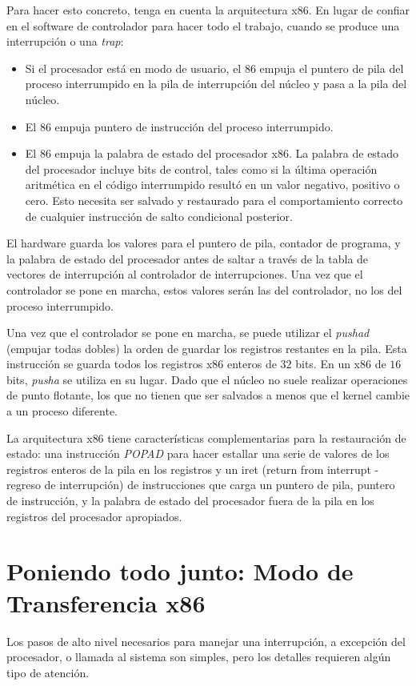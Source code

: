 \documentclass[10pt]{book}
\begin{document}
Para hacer esto concreto, tenga en cuenta la arquitectura x$86$. En lugar de confiar en el software de controlador para hacer todo el trabajo, cuando se produce una interrupción o una \textit{trap}:
\begin{itemize}
\item Si el procesador está en modo de usuario, el $86$ empuja el puntero de pila del proceso interrumpido en la pila de interrupción del núcleo y pasa a la pila del núcleo.

\item El $86$ empuja puntero de instrucción del proceso interrumpido.

\item El $86$ empuja la palabra de estado del procesador x$86$. La palabra de estado del procesador incluye bits de control, tales como si la última operación aritmética en el código interrumpido resultó en un valor negativo, positivo o cero. Esto necesita ser salvado y restaurado para el comportamiento correcto de cualquier instrucción de salto condicional posterior.
\end{itemize}

El hardware guarda los valores para el puntero de pila, contador de programa, y la palabra de estado del procesador antes de saltar a través de la tabla de vectores de interrupción al controlador de interrupciones. Una vez que el controlador se pone en marcha, estos valores serán las del controlador, no los del proceso interrumpido.

Una vez que el controlador se pone en marcha, se puede utilizar el \textit{pushad} (empujar todas dobles) la orden de guardar los registros restantes en la pila. Esta instrucción se guarda todos los registros x$86$ enteros de $32$ bits. En un x$86$ de $16$ bits, \textit{pusha} se utiliza en su lugar. Dado que el núcleo no suele realizar operaciones de punto flotante, los que no tienen que ser salvados a menos que el kernel cambie a un proceso diferente.

La arquitectura x$86$ tiene características complementarias para la restauración de estado: una instrucción \textit{POPAD} para hacer estallar una serie de valores de los registros enteros de la pila en los registros y un iret (return from interrupt - regreso de interrupción) de instrucciones que carga un puntero de pila, puntero de instrucción, y la palabra de estado del procesador fuera de la pila en los registros del procesador apropiados.

\section{Poniendo todo junto: Modo de Transferencia x86}
Los pasos de alto nivel necesarios para manejar una interrupción, a excepción del procesador, o llamada al sistema son simples, pero los detalles requieren algún tipo de atención.
\end{document}
